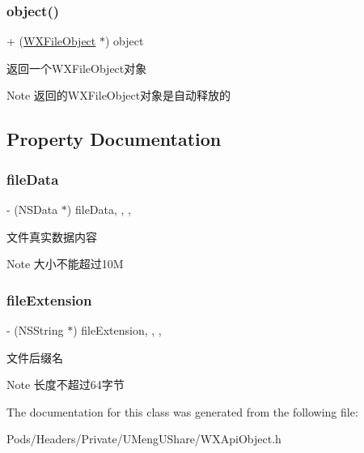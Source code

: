 \subsubsection{\texorpdfstring{object()}{object()}\hspace{0.1cm}{\footnotesize\ttfamily [3/3]}}
{\footnotesize\ttfamily + (\mbox{\hyperlink{interface_w_x_file_object}{W\+X\+File\+Object}} $\ast$) object \begin{DoxyParamCaption}{ }\end{DoxyParamCaption}}



返回一个\+W\+X\+File\+Object对象 

\begin{DoxyNote}{Note}
返回的\+W\+X\+File\+Object对象是自动释放的 
\end{DoxyNote}


\subsection{Property Documentation}
\mbox{\label{interface_w_x_file_object_acf980e52f2f5e14ead6003334d20067b}} 
\subsubsection{\texorpdfstring{file\+Data}{fileData}}
{\footnotesize\ttfamily -\/ (N\+S\+Data $\ast$) file\+Data\hspace{0.3cm}{\ttfamily [read]}, {\ttfamily [write]}, {\ttfamily [nonatomic]}, {\ttfamily [retain]}}

文件真实数据内容 \begin{DoxyNote}{Note}
大小不能超过10M 
\end{DoxyNote}
\mbox{\label{interface_w_x_file_object_aecddee8a8a0e984f9553dc9afaa5d3cc}} 
\subsubsection{\texorpdfstring{file\+Extension}{fileExtension}}
{\footnotesize\ttfamily -\/ (N\+S\+String $\ast$) file\+Extension\hspace{0.3cm}{\ttfamily [read]}, {\ttfamily [write]}, {\ttfamily [nonatomic]}, {\ttfamily [retain]}}

文件后缀名 \begin{DoxyNote}{Note}
长度不超过64字节 
\end{DoxyNote}


The documentation for this class was generated from the following file\+:\begin{DoxyCompactItemize}
\item 
Pods/\+Headers/\+Private/\+U\+Meng\+U\+Share/W\+X\+Api\+Object.\+h\end{DoxyCompactItemize}
